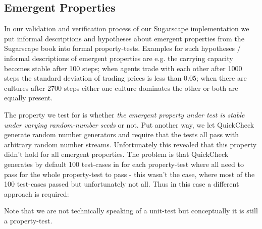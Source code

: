 
\subsection{Emergent Properties}
In our validation and verification process of our Sugarscape implementation we put informal descriptions and hypotheses about emergent properties from the Sugarscape book into formal property-tests. Examples for such hypotheses / informal descriptions of emergent properties are e.g. the carrying capacity becomes stable after 100 steps; when agents trade with each other after 1000 steps the standard deviation of trading prices is less than 0.05; when there are cultures after 2700 steps either one culture dominates the other or both are equally present.

The property we test for is whether \textit{the emergent property under test is stable under varying random-number seeds} or not. Put another way, we let QuickCheck generate random number generators and require that the tests all pass with arbitrary random number streams. Unfortunately this revealed that this property didn't hold for all emergent properties. The problem is that QuickCheck generates by default 100 test-cases in for each property-test where all need to pass for the whole property-test to pass - this wasn't the case, where most of the 100 test-cases passed but unfortunately not all. Thus in this case a different approach is required:

Note that we are not technically speaking of a unit-test but conceptually it is still a property-test.